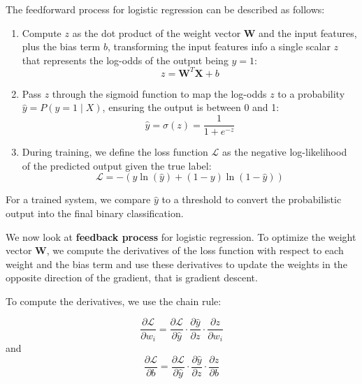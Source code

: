 		
		The feedforward process for logistic regression can be described as follows:
		
		\begin{enumerate}[]
			\item Compute $z$ as the dot product of the weight vector $\textbf{W}$ and the input features, plus the bias term $b$, transforming the input features info a single scalar $z$ that represents the log-odds of the output being $y=1$: 
			\begin{equation}
				z= \textbf{W}^{T}\textbf{X} + b
			\end{equation}
			
			\item Pass $z$ through the sigmoid function to map the log-odds $z$ to a probability $\hat{y} = P(y = 1 \mid X)$, ensuring the output is between 0 and 1: 
			\begin{equation}
				\hat{y} = \sigma(z) = \frac{1}{1 + e^{-z}}
			\end{equation}
			
			\item During training, we define the loss function $\mathcal{L}$ as the negative log-likelihood of the predicted output given the true label: 
			\begin{equation}
				\mathcal{L} = -\left(y\ln(\hat{y}) + (1-y)\ln(1-\hat{y})\right)
			\end{equation}
		\end{enumerate}
		
		For a trained system, we compare $\hat{y}$ to a threshold to convert the probabilistic output into the final binary classification.
		
		\bigskip
		
		We now look at \textbf{feedback process} for logistic regression. To optimize the weight vector $\textbf{W}$, we compute the derivatives of the loss function with respect to each weight and the bias term and use these derivatives to update the weights in the opposite direction of the gradient, that is 
		 gradient descent.
		
		To compute the derivatives, we use the chain rule:
		
		$$
		\frac{\partial\mathcal{L}}{\partial w_i} =
		\frac{\partial\mathcal{L}}{\partial \hat{y}} \cdot
		\frac{\partial \hat{y}}{\partial z} \cdot
		\frac{\partial z}{\partial w_i}
		$$ and
		$$
		\frac{\partial\mathcal{L}}{\partial b} =
		\frac{\partial\mathcal{L}}{\partial \hat{y}} \cdot
		\frac{\partial \hat{y}}{\partial z} \cdot
		\frac{\partial z}{\partial b}
		$$
		

